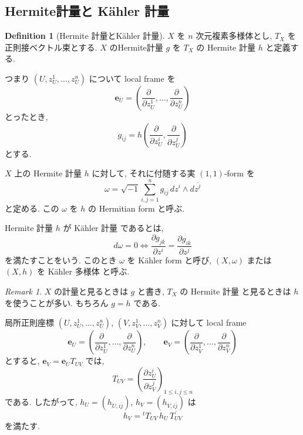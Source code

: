\documentclass[dvipdfmx,a4paper,11pt]{article} %
\theoremstyle{definition}
\newtheorem{defn}[thm]{Definition}
\theoremstyle{remark}
\newtheorem{rem}[thm]{Remark}
\numberwithin{equation}{section}
\begin{document}
\subsection{Hermite計量と K\"ahler 計量}
\label{subsec-Hermite-Kahler}

\begin{defn}[Hermite 計量とK\"ahler 計量]
\(X\) を \(n\) 次元複素多様体とし, \(T_X\) を正則接ベクトル束とする. \(X\) のHermite計量 \(g\) を \(T_X\) の Hermite 計量 \(h\) と定義する.

つまり \((U,z_U^1,\ldots,z_U^n)\) について local frame を
\[
\mathbf{e}_U=\left(\frac{\partial}{\partial z_U^1},\ldots,\frac{\partial}{\partial z_U^n}\right)
\]
とったとき,
\[
g_{i\overline j}=h\left(\frac{\partial}{\partial z_U^i}, \frac{\partial}{\partial z_U^j}\right)
\]
とする.

\(X\) 上の Hermite 計量 \(h\) に対して, それに付随する実 \((1,1)\)-form を
\[
\omega
=
\sqrt{-1}\sum_{i,j=1}^n g_{i\overline j}\,dz^i\wedge d\overline{z^j}
\]
と定める. この \(\omega\) を \(h\) の Hermitian form と呼ぶ.

Hermite 計量 \(h\) が K\"ahler 計量 であるとは,
\[
d\omega=0 \Leftrightarrow 
\frac{\partial g_{j\overline k}}{\partial z^i}
=
\frac{\partial g_{i\overline k}}{\partial z^j}
\]
を満たすことをいう. このとき \(\omega\) を K\"ahler form と呼び, \((X,\omega)\) または \((X,h)\) を K\"ahler 多様体 と呼ぶ.
\end{defn}
\begin{rem}
\(X\) の計量と見るときは \(g\) と書き, \(T_X\) の Hermite 計量 と見るときは \(h\) を使うことが多い. もちろん \(g=h\) である.
\end{rem}

局所正則座標 \((U,z_U^1,\ldots,z_U^n)\), \((V,z_V^1,\ldots,z_V^n)\) に対して local frame
\[
\mathbf{e}_U=\left(\frac{\partial}{\partial z_U^1},\ldots,\frac{\partial}{\partial z_U^n}\right),\qquad
\mathbf{e}_V=\left(\frac{\partial}{\partial z_V^1},\ldots,\frac{\partial}{\partial z_V^n}\right)
\]
とすると, \(\mathbf{e}_V=\mathbf{e}_U T_{UV}\) では,
\[
T_{UV}=
\left(
\frac{\partial z_U^i}{\partial z_V^j}
\right)_{1\leq i,j\leq n}
\]
である. したがって, \(h_U=(h_{U,i\overline j})\), \(h_V=(h_{V,i\overline j})\) は
\[
h_V={}^{t}T_{UV}\,h_U\,\overline{T_{UV}}
\]
を満たす.
\end{document}
